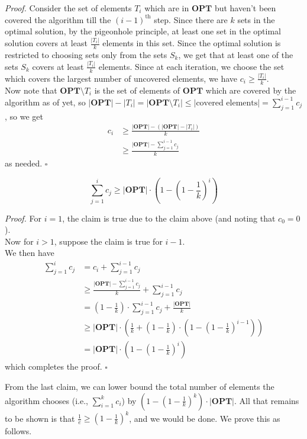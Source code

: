 \documentclass[a4paper]{article}
\newenvironment{proof}{\begin{breakbox}\textit{Proof.}}{\hfill$\square$\end{breakbox}}
\newcommand{\nl}{\vspace{0.2cm}\\}
\newcommand{\OPT}{\mathbf{OPT}}
\begin{document}
\begin{proof}
Consider the set of elements $T_i$ which are in $\OPT$ but haven't been covered the algorithm till the $(i - 1)^\mathrm{th}$ step. Since there are $k$ sets in the optimal solution, by the pigeonhole
    principle, at least one set in the optimal solution covers at least $\frac{|T_i|}{k}$ elements in this set. Since the optimal solution is restricted to choosing sets only from the
    sets $S_k$, we get that at least one of the sets $S_k$ covers at least $\frac{|T_i|}{k}$ elements. Since at each iteration, we choose the set which covers the largest number of
uncovered elements, we have $c_i \ge \frac{|T_i|}{k}$.\nl
Now note that $\OPT \setminus T_i$ is the set of elements of $\OPT$ which are covered by the algorithm as of yet, so $|\OPT| - |T_i| = |\OPT \setminus T_i| \le |\text{covered elements}| = \sum_{j =
1}^{i - 1} c_j$, so we get
\begin{align*}
    c_i &\ge \frac{|\OPT| - (|\OPT| - |T_i|)}{k}\\
        &\ge \frac{|\OPT| - \sum_{j = 1}^{i - 1} c_j}{k}
\end{align*}
as needed.
\end{proof}

\begin{claim}
    $$\sum_{j = 1}^i c_j \ge |\OPT| \cdot \left(1 - \left(1 - \frac{1}{k}\right)^i\right)$$
\end{claim}
\begin{proof}
    For $i = 1$, the claim is true due to the claim above (and noting that $c_0 = 0$).\nl
    Now for $i > 1$, suppose the claim is true for $i - 1$.\nl
    We then have
    \begin{align*}
        \sum_{j = 1}^i c_j &= c_i + \sum_{j = 1}^{i - 1} c_j\\
                &\ge \frac{|\OPT| - \sum_{j = 1}^{i - 1} c_j}{k} + \sum_{j = 1}^{i - 1} c_j\\
                &= \left(1 - \frac{1}{k}\right) \cdot \sum_{j = 1}^{i - 1} c_j + \frac{|\OPT|}{k}\\
                &\ge |\OPT| \cdot \left(\frac{1}{k} + \left(1 - \frac{1}{k}\right)\cdot\left(1 - \left(1 - \frac{1}{k}\right)^{i - 1}\right) \right)\\
                &= |\OPT| \cdot \left(1 - \left(1 - \frac{1}{k}\right)^i\right)
    \end{align*}
    which completes the proof.
\end{proof}

From the last claim, we can lower bound the total number of elements the algorithm chooses (i.e., $\sum_{i=1}^k c_i$) by $\left(1 - \left(1 - \frac{1}{k}\right)^k\right) \cdot |\OPT|$. All that
remains to be shown is that $\frac{1}{e} \ge \left(1 - \frac{1}{k}\right)^k$, and we would be done. We prove this as follows.\nl
\end{document}
